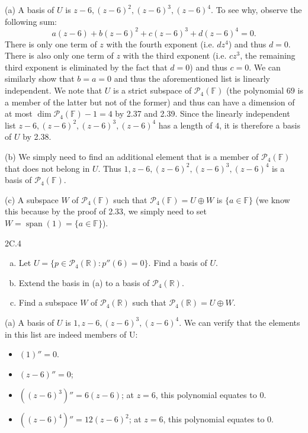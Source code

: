 \documentclass{exam}
\DeclareMathOperator{\spn}{span}
\begin{document}
(a) A basis of $U$ is $z - 6, (z-6)^2, (z-6)^3, (z-6)^4$. To see why, observe the following sum:
\[
    a(z - 6) + b(z - 6)^2 + c(z - 6)^3 + d(z - 6)^4 = 0.
\]
There is only one term of $z$ with the fourth exponent (i.e. $dz^4$) and thus $d = 0$. There is also only one term of $z$ with the third exponent (i.e. $cz^3$, the remaining third exponent is eliminated by the fact that $d = 0$) and thus $c = 0$. We can similarly show that $b = a = 0$ and thus the aforementioned list is linearly independent. We note that $U$ is a strict subspace of $\mathcal P_4(\mathbb F)$ (the polynomial $69$ is a member of the latter but not of the former) and thus can have a dimension of at most $\dim\mathcal P_4(\mathbb F) - 1 = 4$ by 2.37 and 2.39. Since the linearly independent list $z - 6, (z - 6)^2, (z - 6)^3, (z - 6)^4$ has a length of $4$, it is therefore a basis of $U$ by 2.38.

(b) We simply need to find an additional element that is a member of $\mathcal P_4(\mathbb F)$ that does not belong in $U$. Thus $1, z - 6, (z - 6)^2, (z - 6)^3, (z - 6)^4$ is a basis of $\mathcal P_4(\mathbb F)$.

(c) A subspace $W$ of $\mathcal P_4(\mathbb F)$ such that $\mathcal P_4(\mathbb F) = U\oplus W$ is $\{a\in\mathbb F\}$ (we know this because by the proof of 2.33, we simply need to set $W = \spn(1) = \{a\in\mathbb F\}$).

\begin{problem}{2C.4}
    \begin{enumerate}[(a)]
        \item Let $U = \{p\in\mathcal P_4(\mathbb R) : p''(6) = 0\}$. Find a basis of $U$.
        \item Extend the basis in (a) to a basis of $\mathcal P_4(\mathbb R)$.
        \item Find a subspace $W$ of $\mathcal P_4(\mathbb R)$ such that $\mathcal P_4(\mathbb R) = U\oplus W$.
    \end{enumerate}
\end{problem}

(a) A basis of $U$ is $1, z - 6, (z-6)^3, (z-6)^4$. We can verify that the elements in this list are indeed members of U:
\begin{itemize}
    \item $(1)'' = 0$.
    \item $(z - 6)'' = 0$;
    \item $((z - 6)^3)'' = 6(z - 6)$; at $z = 6$, this polynomial equates to $0$.
    \item $((z - 6)^4)'' = 12(z - 6)^2$; at $z = 6$, this polynomial equates to $0$.
\end{itemize}
\end{document}
